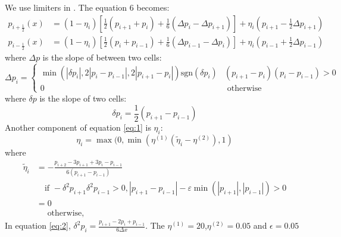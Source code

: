 \documentclass[12pt,a4paper]{article}
\begin{document}
We use limiters in \citep{CW84}. The equation 6 becomes:
\begin{align} \label{eq:1}
p_{i+\frac{1}{2}}(x) & = (1 - \eta_i)[\frac{1}{2}(p_{i+1} + p_{i}) + \frac{1}{6}(\Delta p_{i} - \Delta p_{i+1})] + \eta_i(p_{i+1} - \frac{1}{2}\Delta p_{i+1}) \nonumber \\
p_{i-\frac{1}{2}}(x) & = (1 - \eta_i)[\frac{1}{2}(p_{i} + p_{i-1}) + \frac{1}{6}(\Delta p_{i-1} - \Delta p_{i})] + \eta_i(p_{i-1} + \frac{1}{2}\Delta p_{i-1})
\end{align}
where $\Delta p$ is the slope of between two cells:
\begin{equation} 
\Delta p_i =
  \begin{cases}
    \min(|\delta p_i|, 2|p_i - p_{i-1}|,2|p_{i+1} - p_{i}|)\text{sgn}(\delta p_i)      & (p_{i+1}-p_i)(p_i-p_{i-1})>0\\
    0  & \text{ otherwise}
  \end{cases}
\end{equation}
where $\delta p$ is the slope of two cells:
\begin{equation}
\delta p_i = \frac{1}{2}(p_{i+1} - p_{i-1})
\end{equation}
Another component of equation \ref{eq:1} is $\eta_i$:
\begin{equation}
\eta_i = \max(0,\min(\eta^{(1)}(\widetilde \eta_i-\eta^{(2)}),1)
\end{equation}
where
\begin{align} \label{eq:2}
\widetilde \eta_i &= -\frac{p_{i+2}-3p_{i+1}+3p_i-p_{i-1}}{6(p_{i+1}-p_{i-1})} \nonumber\\
&\quad \text{if } -\delta^2 p_{i+1} \delta^2 p_{i-1}>0, |p_{i+1}-p_{i-1}|-\varepsilon \min(|p_{i+1}|,|p_{i-1}|)>0\\
&=0 \nonumber\\&\quad \text{ otherwise,} \nonumber
\end{align}
In equation \ref{eq:2}, $\delta^2 p_i = \frac{p_{i+1}-2p_{i}+p_{i-1}}{6\Delta x}$. The $\eta^{(1)}=20$,$\eta^{(2)}=0.05$ and $\epsilon=0.05$



\end{document}
